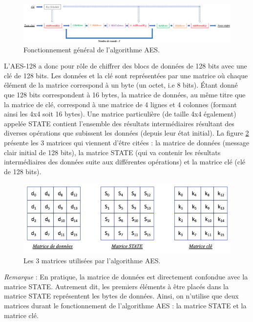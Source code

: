 \documentclass[oneside]{book}
\begin{document}
\vspace{0.5cm}

\begin{figure}[htbp]
    \hspace{-2.1cm}
    \includegraphics[scale=0.48]{image/AES_General}
    \caption{Fonctionnement général de l'algorithme AES.}
    \label{fig:AES_General}
\end{figure}

\newpage

L'AES-128 a donc pour rôle de chiffrer des blocs de données de 128 bits avec une clé de 128 bits. Les données et la clé sont représentées par une matrice où chaque élément de la matrice correspond à un byte (un octet, i.e 8 bits). Étant donné que 128 bits correspondent à 16 bytes, la matrice de données, au même titre que la matrice de clé, correspond à une matrice de 4 lignes et 4 colonnes (formant ainsi les 4x4 soit 16 bytes). Une matrice particulière (de taille 4x4 également) appelée STATE contient l'ensemble des résultats intermédiaires résultant des diverses opérations que subissent les données (depuis leur état initial). La figure \ref{fig:matrix} présente les 3 matrices qui viennent d'être citées : la matrice de données (message clair initial de 128 bits), la matrice STATE (qui va contenir les résultats intermédiaires des données suite aux différentes opérations) et la matrice clé (clé de 128 bits).
\begin{figure}[htbp]
    \centering
    \includegraphics[scale=0.6]{image/matrix}
    \caption{Les 3 matrices utilisées par l'algorithme AES.}
    \label{fig:matrix}
\end{figure}

\hspace{-0.5cm}\textit{Remarque} : En pratique, la matrice de données est directement confondue avec la matrice STATE. Autrement dit, les premiers éléments à être placés dans la matrice STATE représentent les bytes de données. Ainsi, on n'utilise que deux matrices durant le fonctionnement de l'algorithme AES : la matrice STATE et la matrice clé.
\end{document}
